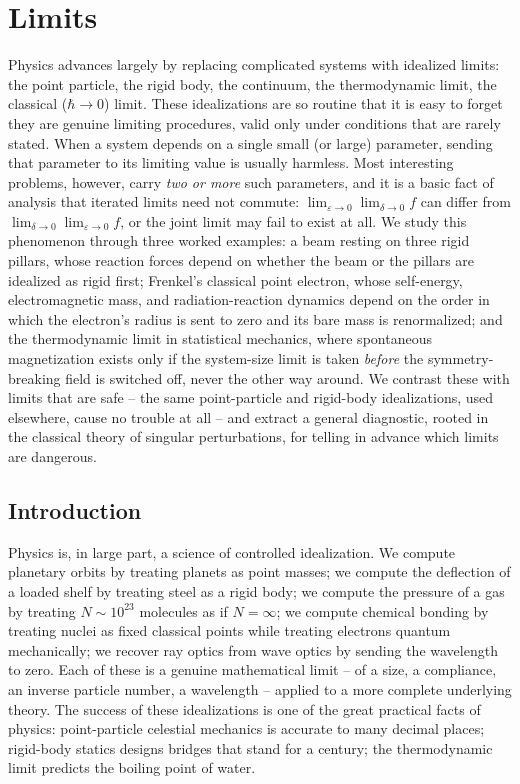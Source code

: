 \chapter{Limits }
\label{limits}

Physics advances largely by replacing complicated systems with
idealized limits: the point particle, the rigid body, the
continuum, the thermodynamic limit, the classical ($\hbar\to0$)
limit. These idealizations are so routine that it is easy to
forget they are genuine limiting procedures, valid only under
conditions that are rarely stated. When a system depends on a
single small (or large) parameter, sending that parameter to its
limiting value is usually harmless. Most interesting problems,
however, carry \emph{two or more} such parameters, and it is a
basic fact of analysis that iterated limits need not commute:
$\lim_{\varepsilon\to0}\lim_{\delta\to0} f$ can differ from
$\lim_{\delta\to0}\lim_{\varepsilon\to0} f$, or the joint limit
may fail to exist at all. We study this phenomenon through three
worked examples: a beam resting on three rigid pillars, whose
reaction forces depend on whether the beam or the pillars are
idealized as rigid first; Frenkel's classical point electron,
whose self-energy, electromagnetic mass, and radiation-reaction
dynamics depend on the order in which the electron's radius is
sent to zero and its bare mass is renormalized; and the
thermodynamic limit in statistical mechanics, where spontaneous
magnetization exists only if the system-size limit is taken
\emph{before} the symmetry-breaking field is switched off, never
the other way around. We contrast these with limits that are
safe -- the same point-particle and rigid-body idealizations,
used elsewhere, cause no trouble at all -- and extract a general
diagnostic, rooted in the classical theory of singular
perturbations, for telling in advance which limits are
dangerous.

\section{Introduction}

Physics is, in large part, a science of controlled idealization.
We compute planetary orbits by treating planets as point masses;
we compute the deflection of a loaded shelf by treating steel as
a rigid body; we compute the pressure of a gas by treating
$N\sim10^{23}$ molecules as if $N=\infty$; we compute chemical
bonding by treating nuclei as fixed classical points while
treating electrons quantum mechanically; we recover ray optics
from wave optics by sending the wavelength to zero. Each of
these is a genuine mathematical limit -- of a size, a
compliance, an inverse particle number, a wavelength -- applied
to a more complete underlying theory. The success of these
idealizations is one of the great practical facts of physics:
point-particle celestial mechanics is accurate to many decimal
places; rigid-body statics designs bridges that stand for a
century; the thermodynamic limit predicts the boiling point of
water.

